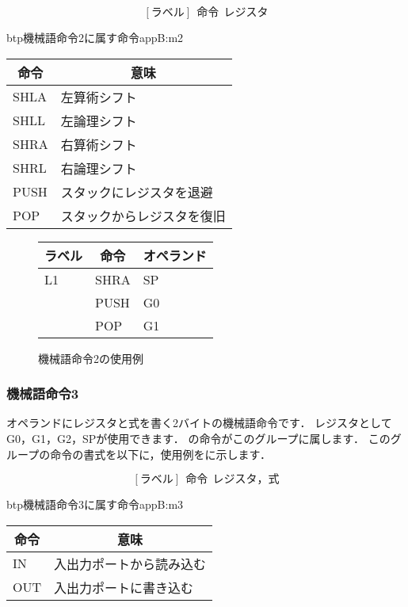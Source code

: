 {\small\[ %
[ラベル]~~命令~~レジスタ \]}

\begin{mytable}{btp}{機械語命令2に属す命令}{appB:m2}
{\small\begin{tabular}{l|l}
\hline\hline
\multicolumn{1}{c|}{命令} & \multicolumn{1}{c}{意味} \\\hline
SHLA & 左算術シフト \\
SHLL & 左論理シフト \\
SHRA & 右算術シフト \\
SHRL & 右論理シフト \\
PUSH & スタックにレジスタを退避 \\
POP  & スタックからレジスタを復旧
\end{tabular}}
\end{mytable}

\begin{figure}[btp]
\begin{center}
{\tt\small\begin{tabular}{|l|l|l|}\hline
\multicolumn{1}{|c|}{ラベル} & 
        \multicolumn{1}{c|}{命令} & \multicolumn{1}{c|}{オペランド} \\\hline
L1  & SHRA &  SP \\
    & PUSH &  G0 \\
    & POP  &  G1 \\\hline
\end{tabular}}
\caption{機械語命令2の使用例}
\label{fig:appB:m2ex}
\end{center}
\end{figure}

\subsubsection{機械語命令3}
オペランドにレジスタと式を書く2バイトの機械語命令です．
レジスタとしてG0，G1，G2，SPが使用できます．
の命令がこのグループに属します．
このグループの命令の書式を以下に，使用例をに示します．

{\small\[ %
[ラベル]~~命令~~レジスタ，式 \]}

\begin{mytable}{btp}{機械語命令3に属す命令}{appB:m3}
{\small\begin{tabular}{l|l}
\hline\hline
\multicolumn{1}{c|}{命令} & \multicolumn{1}{c}{意味} \\\hline
IN & 入出力ポートから読み込む \\
OUT & 入出力ポートに書き込む
\end{tabular}}
\end{mytable}

